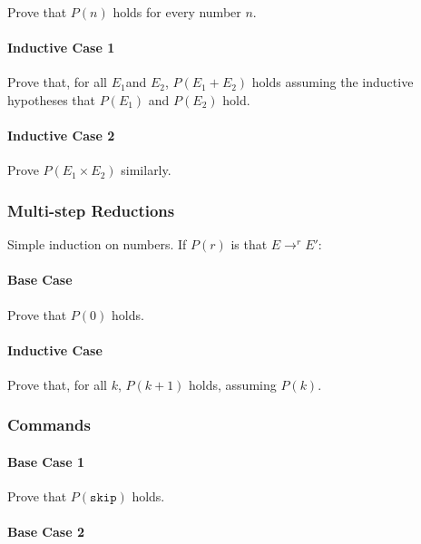 \documentclass[twocolumn,english]{article}
\begin{document}
Prove that $P(n)$ holds for every number $n$.

\paragraph{Inductive Case 1}

Prove that, for all $E_{1}$and $E_{2}$, $P\left(E_{1}+E_{2}\right)$
holds assuming the inductive hypotheses that $P\left(E_{1}\right)$
and $P\left(E_{2}\right)$ hold.

\paragraph{Inductive Case 2}

Prove $P\left(E_{1}\times E_{2}\right)$ similarly.

\subsubsection{Multi-step Reductions}

Simple induction on numbers. If $P\left(r\right)$ is that $E\rightarrow^{r}E'$:

\paragraph{Base Case}

Prove that $P\left(0\right)$ holds.

\paragraph{Inductive Case}

Prove that, for all $k$, $P\left(k+1\right)$ holds, assuming $P\left(k\right)$.

\subsubsection{Commands}

\paragraph{Base Case 1}

Prove that $P(\texttt{skip})$ holds.

\paragraph{Base Case 2}
\end{document}
